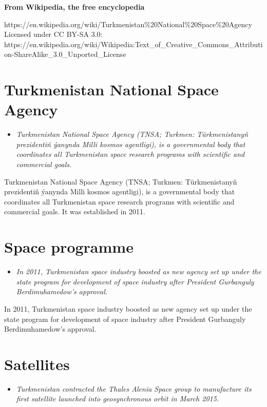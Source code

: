 \textbf{From Wikipedia, the free encyclopedia}

https://en.wikipedia.org/wiki/Turkmenistan\%20National\%20Space\%20Agency\\
Licensed under CC BY-SA 3.0:\\
https://en.wikipedia.org/wiki/Wikipedia:Text\_of\_Creative\_Commons\_Attribution-ShareAlike\_3.0\_Unported\_License

\section{Turkmenistan National Space
Agency}\label{turkmenistan-national-space-agency}

\begin{itemize}
\item
  \emph{Turkmenistan National Space Agency (TNSA; Turkmen:
  Türkmenistanyň prezidentiň ýanynda Milli kosmos agentligi), is a
  governmental body that coordinates all Turkmenistan space research
  programs with scientific and commercial goals.}
\end{itemize}

Turkmenistan National Space Agency (TNSA; Turkmen: Türkmenistanyň
prezidentiň ýanynda Milli kosmos agentligi), is a governmental body that
coordinates all Turkmenistan space research programs with scientific and
commercial goals. It was established in 2011.

\section{Space programme}\label{space-programme}

\begin{itemize}
\item
  \emph{In 2011, Turkmenistan space industry boosted as new agency set
  up under the state program for development of space industry after
  President Gurbanguly Berdimuhamedow's approval.}
\end{itemize}

In 2011, Turkmenistan space industry boosted as new agency set up under
the state program for development of space industry after President
Gurbanguly Berdimuhamedow's approval.

\section{Satellites}\label{satellites}

\begin{itemize}
\item
  \emph{Turkmenistan contracted the Thales Alenia Space group to
  manufacture its first satellite launched into geosynchronous orbit in
  March 2015.}
\end{itemize}

